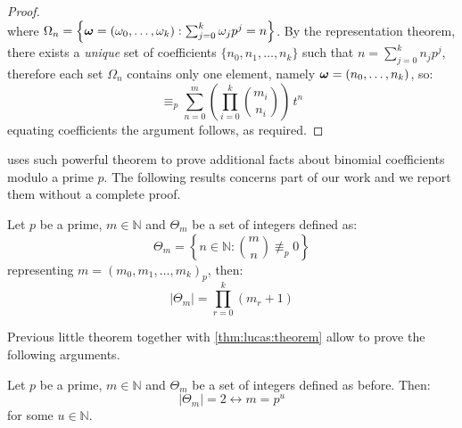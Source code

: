 \begin{proof}
\begin{displaymath}
    \end{displaymath}
    where $\Omega_{n}=\left\lbrace\boldsymbol{\omega}=\left(\omega_{0},\ldots,\omega_{k}\right):
        \sum_{j=0}^{k}{\omega_{j}p^{j}}=n\right\rbrace$.
    By the representation theorem, there exists a \emph{unique} set of coefficients
    $\lbrace n_{0},n_{1},\ldots,n_{k}\rbrace$ such that $n=\sum_{j=0}^{k}{n_{j}p^{j}}$, therefore
    each set $\Omega_{n}$ contains only one element, namely $\boldsymbol{\omega}=(n_{0},\ldots,n_{k})$, so:
    \begin{displaymath}
        \equiv_{p} \sum_{n=0}^{m}{\left({\prod_{i=0}^{k}{{{m_{i}}\choose{n_{i}}}}}\right)\,t^{n}}
    \end{displaymath}
    equating coefficients the argument follows, as required.

\end{proof}

\citeauthor{fine:1947} uses such powerful theorem to prove additional facts
about binomial coefficients modulo a prime $p$. The following results concerns
part of our work and we report them without a complete proof.

\begin{theorem}
    Let $p$ be a prime, $m\in\mathbb{N}$ and $\Theta_{m}$ be a set of integers defined as: 
    \begin{displaymath}
        \Theta_{m}=\left\lbrace n\in\mathbb{N}: 
            {{m}\choose{n}}\not\equiv_{p}0\right\rbrace
    \end{displaymath}
    representing $m=\left(m_{0},m_{1},\ldots,m_{k}\right)_{p}$, then:
    \begin{displaymath}
        \left|\Theta_{m}\right|=\prod_{r=0}^{k}{(m_{r}+1)}
    \end{displaymath}
    \label{thm:fine:divisibility:binomial:coeffs:on:row}
\end{theorem}

Previous little theorem together with \autoref{thm:lucas:theorem} 
allow \citeauthor{fine:1947} to prove the following arguments.

\begin{theorem}
    Let $p$ be a prime, $m\in\mathbb{N}$ and $\Theta_{m}$ 
    be a set of integers defined as before. Then:   
    \begin{displaymath}
        \left|\Theta_{m}\right|=2\leftrightarrow m=p^{u}
    \end{displaymath}
    for some $u\in\mathbb{N}$.
\end{theorem}

